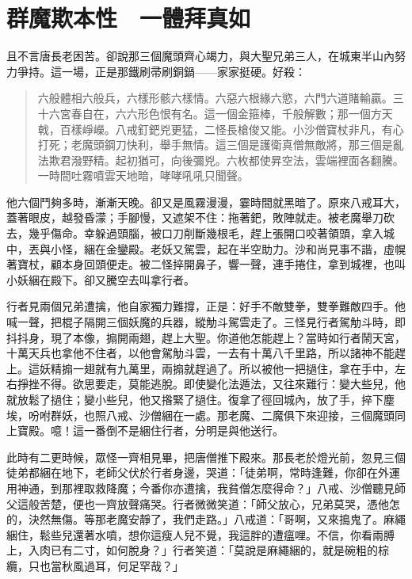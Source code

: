 
\chapter{群魔欺本性　一體拜真如}

且不言唐長老困苦。卻說那三個魔頭齊心竭力，與大聖兄弟三人，在城東半山內努力爭持。這一場，正是那鐵刷帚刷銅鍋——家家挺硬。好殺：
\begin{quote}
六般體相六般兵，六樣形骸六樣情。六惡六根緣六慾，六門六道賭輸贏。三十六宮春自在，六六形色恨有名。這一個金箍棒，千般解數；那一個方天戟，百樣崢嶸。八戒釘鈀兇更猛，二怪長槍俊又能。小沙僧寶杖非凡，有心打死；老魔頭鋼刀快利，舉手無情。這三個是護衛真僧無敵將，那三個是亂法欺君潑野精。起初猶可，向後彌兇。六枚都使昇空法，雲端裡面各翻騰。一時間吐霧噴雲天地暗，哮哮吼吼只聞聲。
\end{quote}

他六個鬥夠多時，漸漸天晚。卻又是風霧漫漫，霎時間就黑暗了。原來八戒耳大，蓋著眼皮，越發昏濛；手腳慢，又遮架不住：拖著鈀，敗陣就走。被老魔舉刀砍去，幾乎傷命。幸躲過頭腦，被口刀削斷幾根毛，趕上張開口咬著領頭，拿入城中，丟與小怪，綑在金鑾殿。老妖又駕雲，起在半空助力。沙和尚見事不諧，虛幌著寶杖，顧本身回頭便走。被二怪捽開鼻子，響一聲，連手捲住，拿到城裡，也叫小妖綑在殿下。卻又騰空去叫拿行者。

行者見兩個兄弟遭擒，他自家獨力難撐，正是：好手不敵雙拳，雙拳難敵四手。他喊一聲，把棍子隔開三個妖魔的兵器，縱觔斗駕雲走了。三怪見行者駕觔斗時，即抖抖身，現了本像，搧開兩翅，趕上大聖。你道他怎能趕上？當時如行者鬧天宮，十萬天兵也拿他不住者，以他會駕觔斗雲，一去有十萬八千里路，所以諸神不能趕上。這妖精搧一翅就有九萬里，兩搧就趕過了。所以被他一把撾住，拿在手中，左右掙挫不得。欲思要走，莫能逃脫。即使變化法遁法，又往來難行：變大些兒，他就放鬆了撾住；變小些兒，他又揝緊了撾住。復拿了徑回城內，放了手，捽下塵埃，吩咐群妖，也照八戒、沙僧綑在一處。那老魔、二魔俱下來迎接，三個魔頭同上寶殿。噫！這一番倒不是綑住行者，分明是與他送行。

此時有二更時候，眾怪一齊相見畢，把唐僧推下殿來。那長老於燈光前，忽見三個徒弟都綑在地下，老師父伏於行者身邊，哭道：「徒弟啊，常時逢難，你卻在外運用神通，到那裡取救降魔；今番你亦遭擒，我貧僧怎麼得命？」八戒、沙僧聽見師父這般苦楚，便也一齊放聲痛哭。行者微微笑道：「師父放心，兄弟莫哭，憑他怎的，決然無傷。等那老魔安靜了，我們走路。」八戒道：「哥啊，又來搗鬼了。麻繩綑住，鬆些兒還著水噴，想你這瘦人兒不覺，我這胖的遭瘟哩。不信，你看兩膊上，入肉已有二寸，如何脫身？」行者笑道：「莫說是麻繩綑的，就是碗粗的棕纜，只也當秋風過耳，何足罕哉？」

